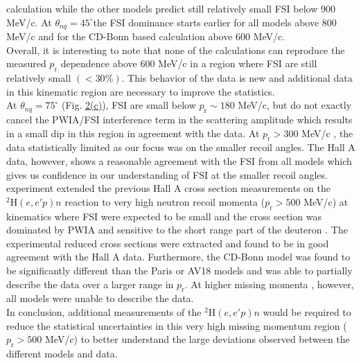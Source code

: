 calculation while the other models predict still relatively small FSI below 900 MeV/c.
At $\theta_{nq}=45^{\circ}$\DIFaddbegin \DIFadd{, }\DIFaddend the FSI dominance starts earlier for all models above 800 MeV/c and for the CD-Bonn based calculation above 600 MeV/c. \\
\indent Overall, it is interesting to note that none of the calculations can reproduce the measured $p_{\mathrm{r}}$ dependence above 600 MeV/c in a region where FSI are still relatively small $(<30\%)$.  This behavior of the data is new
and additional data in this kinematic region are necessary to improve the statistics. \\
\indent At $\theta_{nq}=75^{\circ}$ (Fig. \hyperref[fig:fig2]{2(c)}), FSI are small below $p_{\mathrm{r}}\sim180$ MeV/c, but do not exactly cancel the PWIA/FSI interference term in the scattering amplitude which results in a small dip in this region in agreement with the data.
At $p_{\mathrm{r}}>300$ MeV/c \DIFaddbegin {}\DIFaddend , the data \DIFdelbegin {}\DIFdelend \DIFaddbegin {}\DIFaddend statistically limited as our focus was on the smaller recoil angles. The Hall A data, however, shows a reasonable agreement with the FSI from all models which gives us confidence in our understanding
of FSI at the smaller recoil angles. \\
\indent \DIFdelbegin {}\DIFdelend \DIFaddbegin {}\DIFaddend experiment extended the previous Hall A cross section measurements on the $^{2}\mathrm{H}(e,e'p)n$ reaction to 
very high neutron recoil momenta ($p_{\mathrm{r}}>500$ MeV/c) at kinematics where FSI were expected to be small and the cross section was dominated by PWIA and sensitive to the
short range part of the deuteron \DIFdelbegin {}\DIFdelend \DIFaddbegin {}\DIFaddend . The experimental reduced cross sections were extracted and found to be in good agreement with the Hall A data.
Furthermore, the CD-Bonn model was found to be significantly different than the Paris or AV18 models and was able to partially describe the data over a larger range in $p_{\mathrm{r}}$.
At higher missing momenta \DIFaddbegin {}\DIFaddend , however, all models were unable to describe the data. \\
\indent In conclusion, additional measurements of the $^{2}\mathrm{H}(e,e'p)n$ would be required to reduce the statistical uncertainties in this very high missing
momentum region ($p_{\mathrm{r}}>500$ MeV/c) to better understand the large deviations observed between the different models and data.
